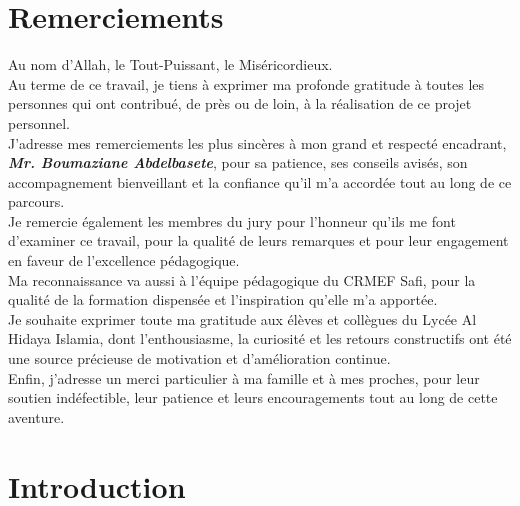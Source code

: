 \documentclass[a4paper,11pt]{report}
\begin{document}
\chapter*{Remerciements}
Au nom d'Allah, le Tout-Puissant, le Miséricordieux.\\
Au terme de ce travail, je tiens à exprimer ma profonde gratitude à toutes les personnes qui ont contribué, de près ou de loin, à la réalisation de ce projet personnel.\\
J'adresse mes remerciements les plus sincères à mon grand et respecté encadrant, {\bfseries\textit{Mr. Boumaziane Abdelbasete}}, pour sa patience, ses conseils avisés, son accompagnement bienveillant et la confiance qu'il m'a accordée tout au long de ce parcours.\\
Je remercie également les membres du jury pour l'honneur qu'ils me font d'examiner ce travail, pour la qualité de leurs remarques et pour leur engagement en faveur de l'excellence pédagogique.\\
Ma reconnaissance va aussi à l'équipe pédagogique du CRMEF Safi, pour la qualité de la formation dispensée et l'inspiration qu'elle m'a apportée.\\
Je souhaite exprimer toute ma gratitude aux élèves et collègues du Lycée Al Hidaya Islamia, dont l'enthousiasme, la curiosité et les retours constructifs ont été une source précieuse de motivation et d'amélioration continue.\\
Enfin, j'adresse un merci particulier à ma famille et à mes proches, pour leur soutien indéfectible, leur patience et leurs encouragements tout au long de cette aventure.

\cleardoublepage
\tableofcontents
\clearpage


\chapter*{Introduction}
\end{document}
